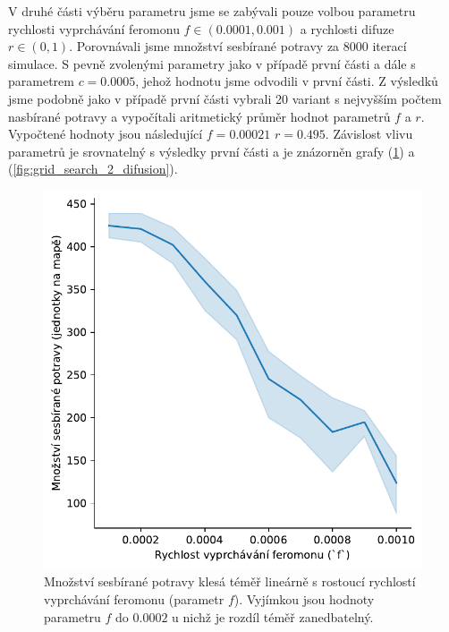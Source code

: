 \documentclass[10pt,a4paper,twocolumn]{article}
\begin{document}
V druhé části výběru parametru jsme se zabývali pouze volbou parametru
rychlosti vyprchávání feromonu $f \in (0.0001, 0.001)$ a rychlosti 
difuze $r \in (0, 1)$. Porovnávali jsme množství sesbírané potravy za 
$8000$ iterací simulace. S pevně zvolenými parametry jako v případě 
první části a dále s parametrem $c = 0.0005$, jehož hodnotu jsme 
odvodili v první části. Z výsledků jsme podobně jako v případě 
první části vybrali 20 variant s nejvyšším počtem nasbírané potravy
a vypočítali aritmetický průměr hodnot parametrů $f$ a $r$. Vypočtené 
hodnoty jsou následující $f = 0.00021$ $r = 0.495$. Závislost vlivu 
parametrů je srovnatelný s výsledky první části a je znázorněn
grafy (\ref{fig:grid_search_2_fade}) a (\ref{fig:grid_search_2_difusion}).


\begin{figure}[tb]
  \centering
  \includegraphics[width=0.9\linewidth]{images/grid_search_2_fade.pdf}
  \caption{Množství sesbírané potravy klesá téměř lineárně s rostoucí 
  rychlostí vyprchávání feromonu (parametr $f$). Vyjímkou jsou hodnoty
  parametru $f$ do $0.0002$ u nichž je rozdíl téměř zanedbatelný.}
  \label{fig:grid_search_2_fade}
\end{figure}
\end{document}
